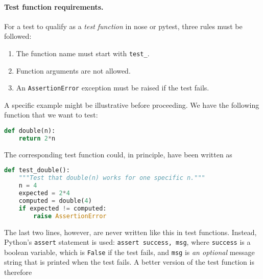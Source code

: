 \documentclass[graybox,sectrefs,envcountresetchap,open=right,final]{svmonodo}
\begin{document}
\paragraph{Test function requirements.}
For a test to qualify as a \emph{test function} in nose or pytest, three
rules must be followed:

\begin{enumerate}
 \item The function name must start with \Verb!test_!.

 \item Function arguments are not allowed.

 \item An \texttt{AssertionError} exception must be raised if the test fails.
\end{enumerate}

\noindent
A specific example might be illustrative before proceeding.
We have the following function that we want to test:




\begin{lstlisting}[language=python,style=blue1_bluegreen]
def double(n):
    return 2*n

\end{lstlisting}

The corresponding test function could, in principle, have been written
as









\begin{lstlisting}[language=python,style=blue1_bluegreen]
def test_double():
    """Test that double(n) works for one specific n."""
    n = 4
    expected = 2*4
    computed = double(4)
    if expected != computed:
        raise AssertionError

\end{lstlisting}

The last two lines, however, are never written like this in test functions.
Instead, Python's \texttt{assert} statement is used: \texttt{assert success, msg}, where
\texttt{success} is a boolean variable, which is \texttt{False} if the test fails, and
\texttt{msg} is \emph{an optional} message string that is printed when the test fails.
A better version of the test function is therefore
\end{document}
